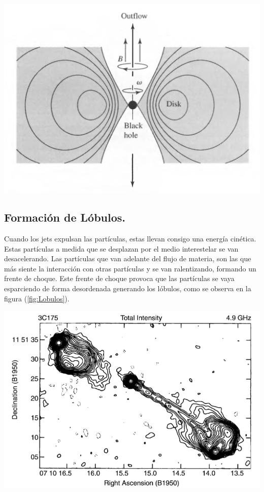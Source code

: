 \includegraphics[scale=.4]{./figures/3_AGNs/Jets.png}
\label{fig:Modelo_interior_AGN}


	\subsection{Formación de Lóbulos.}
	\label{subsec:Formation_lobules}

Cuando los jets expulsan las partículas, estas llevan consigo una energía cinética. Estas partículas a medida que se desplazan por el medio interestelar se van desacelerando. Las partículas que van adelante del flujo de materia, son las que más siente la interacción con otras partículas y se van ralentizando, formando un frente de choque. Este frente de choque provoca que las partículas se vaya esparciendo  de forma desordenada generando los lóbulos, como se observa en la figura (\ref{fig:Lobulos}).

\includegraphics[scale=.3]{./figures/3_AGNs/Lobulos_y_Jets.png}
\label{fig:Lobulos}


